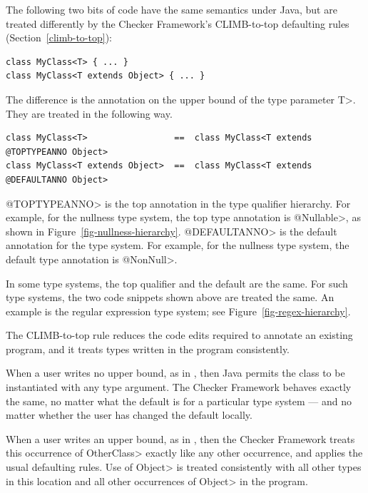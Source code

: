 
The following two bits of code have the same semantics under Java, but are
treated differently by the Checker Framework's CLIMB-to-top defaulting
rules (Section~\ref{climb-to-top}):

\begin{Verbatim}
class MyClass<T> { ... }
class MyClass<T extends Object> { ... }
\end{Verbatim}

The difference is the annotation on the upper bound of the type parameter
\<T>.  They are treated in the following way.

\begin{Verbatim}
class MyClass<T>                 ==  class MyClass<T extends @TOPTYPEANNO Object>
class MyClass<T extends Object>  ==  class MyClass<T extends @DEFAULTANNO Object>
\end{Verbatim}

\noindent
\<@TOPTYPEANNO> is the top annotation in the type qualifier hierarchy.  For
example, for the nullness type system, the top type annotation is
\<@Nullable>, as shown in Figure~\ref{fig-nullness-hierarchy}.
\<@DEFAULTANNO> is the default annotation for the type system.  For
example, for the nullness type system, the default type annotation is
\<@NonNull>.

In some type systems, the top qualifier and the default are the same.  For
such type systems, the two code snippets shown above are treated the same.
An example is the regular expression type system; see
Figure~\ref{fig-regex-hierarchy}.

The CLIMB-to-top rule reduces the code edits required to annotate an
existing program, and it treats types written in the program consistently.

When a user writes no upper bound, as in
,
then Java permits the class to be instantiated with any type argument.
The Checker Framework behaves exactly the same, no matter what the default
is for a particular type system --- and no matter whether the user has
changed the default locally.

When a user writes an upper bound, as in
,
then the Checker Framework treats this occurrence of \<OtherClass> exactly
like any other occurrence, and applies the usual defaulting rules.  Use of
\<Object> is treated consistently with all other types in this location and
all other occurrences of \<Object> in the program.

